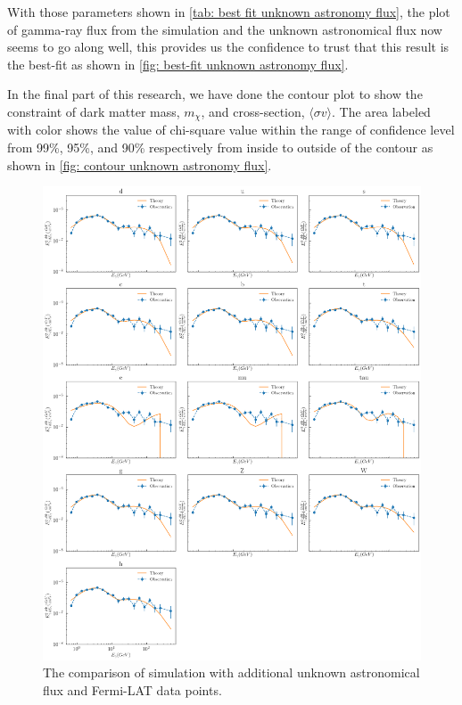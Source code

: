\documentclass[10pt, oneside]{book}
\numberwithin{equation}{chapter}
\begin{document}
With those parameters shown in \autoref{tab: best fit unknown astronomy flux}, the plot of gamma-ray flux from the simulation and the unknown astronomical flux now seems to go along well, this provides us the confidence to trust that this result is the best-fit as shown in \autoref{fig: best-fit unknown astronomy flux}.

In the final part of this research, we have done the contour plot to show the constraint of dark matter mass, $m_\chi$, and cross-section, $\langle \sigma v \rangle$. The area labeled with color shows the value of chi-square value within the range of confidence level from 99\%, 95\%, and 90\% respectively from inside to outside of the contour as shown in \autoref{fig: contour unknown astronomy flux}.

\begin{figure}
    \centering
    \includegraphics[width=\linewidth]{images/Best_fit_not_all_2.png}
    \caption{The comparison of simulation with additional unknown astronomical flux and Fermi-LAT data points.}
    \label{fig: best-fit unknown astronomy flux}
\end{figure}
\end{document}
